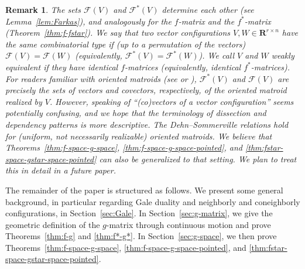 \documentclass[11pt]{article}
\newtheorem{remark}[theorem]{Remark}
\newcommand{\R}{\mathbf{R}}
\begin{document}
\begin{remark}\label{rem:OM}
The sets $\mathcal{F}(V)$ and $\mathcal{F}^*(V)$ determine each other (see Lemma~\ref{lem:Farkas}), and analogously for the $f$-matrix and the $f^*$-matrix (Theorem~\ref{thm:f-fstar}). We say that two vector configurations $V,W \in \R^{r\times n}$ have the same \emph{combinatorial type} if (up to a permutation of the vectors) $\mathcal{F}(V)=\mathcal{F}(W)$ (equivalently,  $\mathcal{F}^*(V)=\mathcal{F}^*(W)$). We call $V$ and $W$ \emph{weakly equivalent} if they have identical $f$-matrices (equivalently, identical $f^*$-matrices).
%
For readers familiar with \emph{oriented matroids} (see \cite[Ch.~6]{Ziegler:1995aa} or \cite{Bjorner:1999aa}), $\mathcal{F}^*(V)$ and $\mathcal{F}(V)$ are precisely the sets of \emph{vectors} and \emph{covectors}, respectively, of the oriented matroid realized by $V$. However, speaking of ``(co)vectors of a vector configuration'' seems potentially confusing, and we hope that the terminology of dissection and dependency patterns is more descriptive. The Dehn--Sommerville relations hold for (uniform, not necessarily realizable) oriented matroids. We believe that Theorems~\ref{thm:f-space-g-space}, \ref{thm:f-space-g-space-pointed}, and \ref{thm:fstar-space-gstar-space-pointed} can also be generalized to that setting.
We plan to treat this in detail in a future paper.
\end{remark}
The remainder of the paper is structured as follows. We present some general background, in particular regarding Gale duality and neighborly and coneighborly configurations, in Section~\ref{sec:Gale}. In Section~\ref{sec:g-matrix}, we give the geometric definition of the $g$-matrix through continuous motion and prove Theorems~\ref{thm:f-g} and \ref{thm:f*-g*}. 
In Section~\ref{sec:g-space}, we then prove Theorems~\ref{thm:f-space-g-space}, \ref{thm:f-space-g-space-pointed}, and \ref{thm:fstar-space-gstar-space-pointed}. 
%
%
\end{document}
